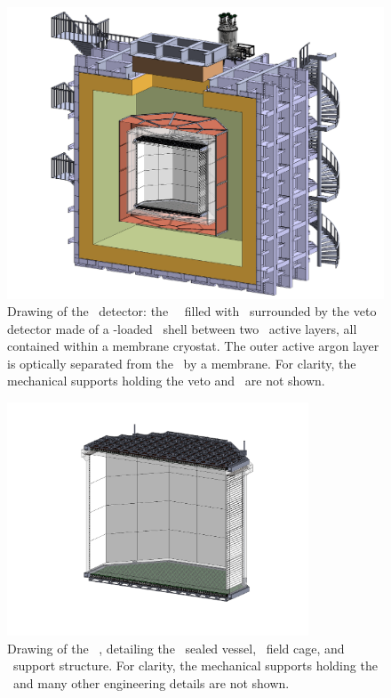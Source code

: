 \begin{figure}[t!]
\begin{center}
\includegraphics[width=\textwidth]{Figures/DSk3D.pdf}
\caption[Drawing of the \DSk\ detector.]{Drawing of the \DSks\ detector: the \PMMA\ \TPC\ filled with \UAr\ surrounded by the veto detector made of a -loaded \PMMA\ shell between two \AAr\ active layers, all contained within a membrane cryostat. The outer active argon layer is optically separated from the \AAr\ by a membrane.  For clarity, the mechanical supports holding the veto and \TPC\ are not shown.}
\label{fig:DSk3D}
\end{center}
\end{figure}


\begin{figure}[t!]
\begin{center}
\includegraphics[width=0.8\textwidth]{Figures/TPC-acrylic-vessel-design.pdf}
\caption[Drawing of the \DSk\ \LArTPC.]{Drawing of the \DSk\ \LArTPC, detailing the \PMMA\ sealed vessel, \TPC\ field cage, and \DSkPdms\ support structure.    For clarity, the mechanical supports holding the \TPC\ and many other engineering details are not shown.}
\label{fig:DSk3D}
\end{center}
\end{figure}

